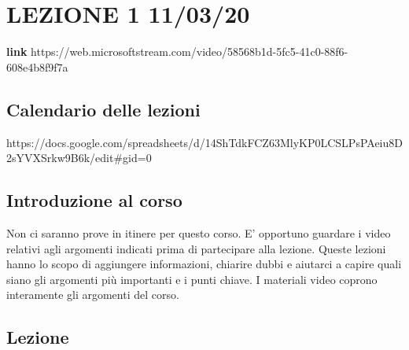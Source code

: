 \section{LEZIONE 1 11/03/20}
\textbf{link}
https://web.microsoftstream.com/video/58568b1d-5fc5-41c0-88f6-608e4b8f9f7a
\subsection{Calendario delle lezioni}
https://docs.google.com/spreadsheets/d/14ShTdkFCZ63MlyKP0LCSLPsPAeiu8D2sYVXSrkw9B6k/edit\#gid=0
\subsection{Introduzione al corso}
Non ci saranno prove in itinere per questo corso.\newline
E' opportuno guardare i video relativi agli argomenti indicati prima di partecipare alla lezione.\newline
Queste lezioni hanno lo scopo di aggiungere informazioni, chiarire dubbi e aiutarci a capire quali siano gli argomenti più importanti e i punti chiave.\newline
I materiali video coprono interamente gli argomenti del corso.
\subsection{Lezione}
